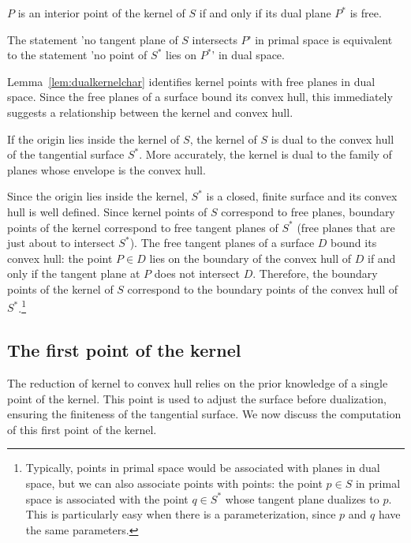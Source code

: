 \documentclass[doublespacing]{elsart}
\begin{document}
\begin{lemma}
\label{lem:dualkernelchar}
$P$ is an interior point of the kernel of $S$ if and only if 
its dual plane $P^*$ is free.
\end{lemma}
\prf
The statement 'no tangent plane of $S$ intersects $P$' in primal space
is equivalent to the statement 'no point of $S^*$ lies on $P^*$' in dual space.
\QED

Lemma~\ref{lem:dualkernelchar} identifies kernel points
with free planes in dual space.
Since the free planes of a surface bound its convex hull,
this immediately suggests a relationship between the kernel and convex hull.

\begin{theorem}
\label{thm:kernelhull}
If the origin lies inside the kernel of $S$,
the kernel of $S$ is dual to the convex hull of the tangential surface $S^*$.
More accurately, the kernel is dual to the family of planes whose
envelope is the convex hull.
\end{theorem}
\prf
Since the origin lies inside the kernel, $S^*$ is a closed, finite surface
and its convex hull is well defined.
Since kernel points of $S$ correspond to free planes,
boundary points of the kernel correspond to free tangent planes of $S^*$
(free planes that are just about to intersect $S^*$).
The free tangent planes of a surface $D$ bound its convex hull: the point $P \in D$ lies
on the boundary of the convex hull of $D$ if and only if the tangent plane at $P$ 
does not intersect $D$.
Therefore, the boundary points of the kernel of $S$ correspond to the boundary points
of the convex hull of $S^*$.\footnote{Typically, points in primal space would be associated with planes in dual space,
	but we can also associate points with points:
	the point $p \in S$ in primal space is associated
	with the point $q \in S^*$ whose tangent plane dualizes to $p$.
	This is particularly easy when there is a parameterization, since $p$ and $q$ 
	have the same parameters.}
\QED


\subsection{The first point of the kernel}
\label{sec:firstpt}

The reduction of kernel to convex hull relies on the prior knowledge
of a single point of the kernel.
This point is used to adjust the surface before dualization, ensuring
the finiteness of the tangential surface.
We now discuss the computation of this first point of the kernel.
\end{document}
